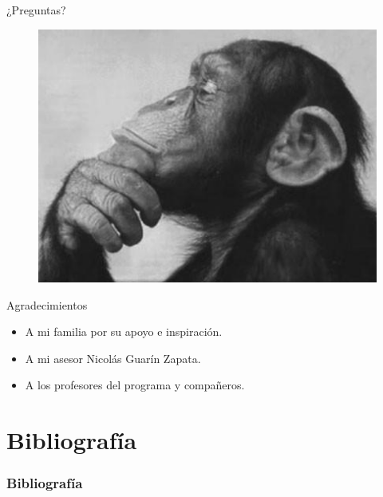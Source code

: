 \documentclass[xcolor=table,serif,handout]{beamer}
\begin{document}
	\begin{frame}{¿Preguntas?}
	\begin{figure}
	\centering
	\includegraphics[scale=0.5]{thinker.jpeg}	
	\end{figure}

	\end{frame}
	\begin{frame}{Agradecimientos}
	\begin{itemize}
		\item<1-> A mi familia por su apoyo e inspiración.
		\item<2-> A mi asesor Nicolás Guarín Zapata.
		\item<3-> A los profesores del programa y compañeros.
	\end{itemize}		
	\end{frame}
	
\section{Bibliograf\'ia}
  \begin{frame}[allowframebreaks]
  \frametitle{Bibliograf\'ia}
  
  
  \end{frame}
\end{document}
